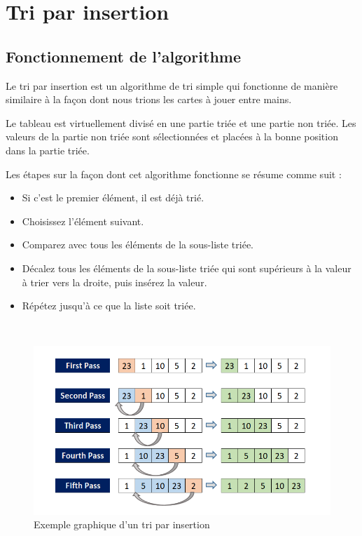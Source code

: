 
\chapter{Tri par insertion}
\section{Fonctionnement de l'algorithme}

Le tri par insertion est un algorithme de tri simple qui fonctionne de manière similaire à la façon dont nous trions les cartes à jouer entre mains. 
\par
Le tableau est virtuellement divisé en une partie triée et une partie non triée. Les valeurs de la partie non triée sont sélectionnées et placées à la bonne position dans la partie triée.
\par
Les étapes sur la façon dont cet algorithme fonctionne se résume comme suit :
\begin{itemize}
\item Si c'est le premier élément, il est déjà trié.
\item Choisissez l'élément suivant.
\item Comparez avec tous les éléments de la sous-liste triée.
\item Décalez tous les éléments de la sous-liste triée qui sont supérieurs à la valeur à trier vers la droite, puis insérez la valeur.
\item Répétez jusqu'à ce que la liste soit triée.
\end{itemize}
\\
\begin{figure}[H]
    \centering
        \includegraphics[scale=0.45]{ressources/insert.png}
        \caption{Exemple graphique d’un tri par insertion}
    \label{fig:insert}
\end{figure}
